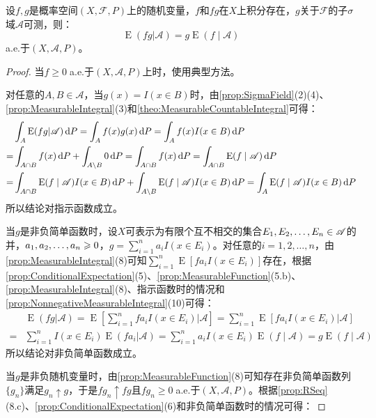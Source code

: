 \begin{theorem}\label{theo:ConditionalExpectationPullOut}
	设$f,g$是概率空间$(X,\mathscr{F},P)$上的随机变量，$f$和$fg$在$X$上积分存在，$g$关于$\mathscr{F}$的子$\sigma$域$\mathscr{A}$可测，则：
	\begin{equation*}
		\operatorname{E}(fg|\mathscr{A})=g\operatorname{E}(f\mid\mathscr{A})
	\end{equation*}
	a.e.于$(X,\mathscr{A},P)$。
\end{theorem}
\begin{proof}
	当$f\geqslant0\;$a.e.于$(X,\mathscr{A},P)$上时，使用典型方法。\par
	对任意的$A,B\in\mathscr{A}$，当$g(x)=I(x\in B)$时，由\cref{prop:SigmaField}(2)(4)、\cref{prop:MeasurableIntegral}(3)和\cref{theo:MeasurableCountableIntegral}可得：
	\begin{align*}
		&\int_{A}\operatorname{E}(fg|\mathscr{A})\dif P=\int_{A}f(x)g(x)\dif P=\int_{A}f(x)I(x\in B)\dif P \\
		=&\int_{A\cap B}f(x)\dif P+\int_{A\setminus B}0\dif P=\int_{A\cap B}f(x)\dif P=\int_{A\cap B}\operatorname{E}(f\mid\mathscr{A})\dif P \\
		=&\int_{A\cap B}\operatorname{E}(f\mid\mathscr{A})I(x\in B)\dif P+\int_{A\setminus B}\operatorname{E}(f\mid\mathscr{A})I(x\in B)\dif P=\int_{A}\operatorname{E}(f\mid\mathscr{A})I(x\in B)\dif P
	\end{align*}
	所以结论对指示函数成立。\par
	当$g$是非负简单函数时，设$X$可表示为有限个互不相交的集合$E_1, E_2, \dots, E_{n}\in\mathscr{A}$的并，$a_1, a_2, \dots, a_{n}\geqslant0$，$g=\sum\limits_{i=1}^{n}a_iI(x\in E_i)$。对任意的$i=1,2,\dots,n$，由\cref{prop:MeasurableIntegral}(8)可知$\sum\limits_{i=1}^{n}\operatorname{E}[fa_iI(x\in E_i)]$存在，根据\cref{prop:ConditionalExpectation}(5)、\cref{prop:MeasurableFunction}(5.b)、\cref{prop:MeasurableIntegral}(8)、指示函数时的情况和\cref{prop:NonnegativeMeasurableIntegral}(10)可得：
	\begin{align*}
		&\operatorname{E}(fg|\mathscr{A})=\operatorname{E}\left[\sum_{i=1}^{n}fa_iI(x\in E_i)\Big|\mathscr{A}\right]=\sum_{i=1}^{n}\operatorname{E}[fa_iI(x\in E_i)|\mathscr{A}] \\
		=&\sum_{i=1}^{n}I(x\in E_i)\operatorname{E}(fa_i|\mathscr{A})=\sum_{i=1}^{n}a_iI(x\in E_i)\operatorname{E}(f\mid\mathscr{A})=g\operatorname{E}(f\mid\mathscr{A})
	\end{align*}
	所以结论对非负简单函数成立。\par
	当$g$是非负随机变量时，由\cref{prop:MeasurableFunction}(8)可知存在非负简单函数列$\{g_n\}$满足$g_n\uparrow g$，于是$fg_n\uparrow fg$且$fg_n\geqslant0\;$a.e.于$(X,\mathscr{A},P)$。根据\cref{prop:RSeq}(8.c)、\cref{prop:ConditionalExpectation}(6)和非负简单函数时的情况可得：

\end{proof}
